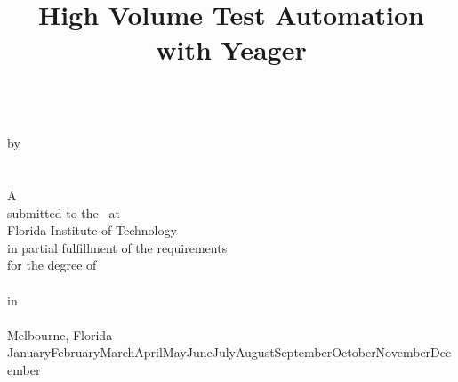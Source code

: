 \documentclass[12pt]{report}
\title{High Volume Test Automation with Yeager} %
\begin{document}
\edef\today{%
\ifcase\month\or January\or February\or March\or April\or May\or June\or July\or August\or September\or October\or November\or December\fi{}
\number\year}
\thispagestyle{empty}
\vspace*{0.5in}
\begin{center}
\textbf{
{\Large
\lastitle\\
}}
\vspace{2\baselineskip}
by\\[1\baselineskip]
\lasstudent\\[1\baselineskip]
\lasstudentpredegreefirst\\[1\baselineskip]
A \lasthesisstyle\\
submitted to the \lascollegename\ at\\
Florida Institute of Technology\\
in partial fulfillment of the requirements\\
for the degree of\\[3\baselineskip]
\lasdegree\\
in\\
\lasdiscipline\\
\vspace{\fill}
Melbourne, Florida\\
\today
\end{center}
\permissionpage{}
\committeepage{}
\newpage

\tableofcontents
\newpage


\doublespacing {}






\end{document}
